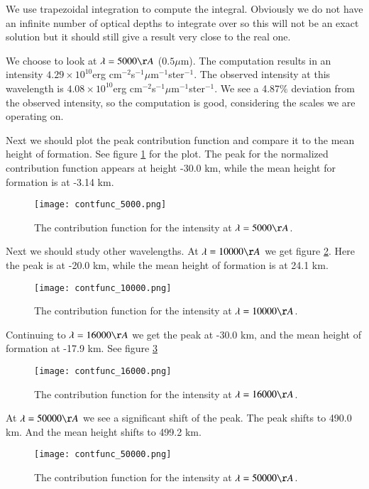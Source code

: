\documentclass{aa}   %
\begin{document}
We use trapezoidal integration to compute the integral. Obviously we do not have an infinite number of optical depths to integrate over so this will not be an exact solution but it should still give a result very close to the real one.

We choose to look at $\lambda  = 5000 \AA$ ($0.5\mu$m). The computation results in an intensity $4.29\times10^{10}$erg cm$^{-2}$s$^{-1}\mu$m$^{-1}$ster$^{-1}$. The observed intensity at this wavelength is $4.08\times10^{10}$erg cm$^{-2}$s$^{-1}\mu$m$^{-1}$ster$^{-1}$. We see a 4.87$\%$ deviation from the observed intensity, so the computation is good, considering the scales we are operating on.

Next we should plot the peak contribution function and compare it to the mean height of formation.
See figure \ref{contfunc_5000} for the plot. The peak for the normalized contribution function appears at height -30.0 km, while the mean height for formation is at -3.14 km.

\begin{figure}
 \texttt{[image: contfunc\_5000.png]}
 \caption{The contribution function for the intensity at $\lambda= 5000\AA$.}
 \label{contfunc_5000}
\end{figure}

Next we should study other wavelengths. At $\lambda = 10000\AA$ we get figure \ref{contfunc_10000}. Here the peak is at -20.0 km, while the mean height of formation is at 24.1 km.

\begin{figure}
 \texttt{[image: contfunc\_10000.png]}
 \caption{The contribution function for the intensity at $\lambda= 10000\AA$.}
 \label{contfunc_10000}
\end{figure}

Continuing to $\lambda = 16000\AA$ we get the peak at -30.0 km, and the mean height of formation at -17.9 km. See figure \ref{contfunc_16000}

\begin{figure}
 \texttt{[image: contfunc\_16000.png]}
 \caption{The contribution function for the intensity at $\lambda= 16000\AA$.}
 \label{contfunc_16000}
\end{figure}

At $\lambda = 50000\AA$ we see a significant shift of the peak. The peak shifts to 490.0 km. And the mean height shifts to 499.2 km.

\begin{figure}
 \texttt{[image: contfunc\_50000.png]}
 \caption{The contribution function for the intensity at $\lambda= 50000\AA$.}
 \label{contfunc_50000}
\end{figure}
\end{document}
